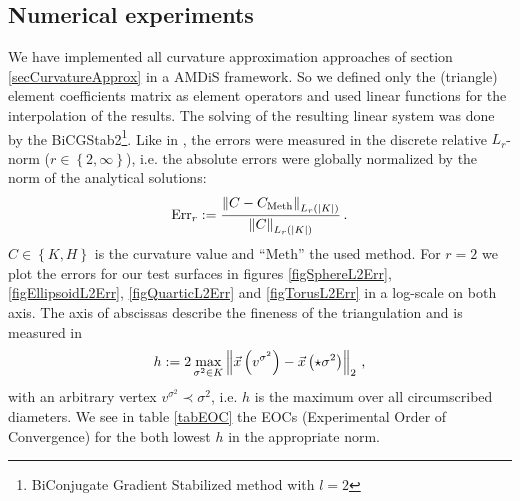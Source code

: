   \subsection{Numerical experiments}
    We have implemented all curvature approximation approaches of section \ref{secCurvatureApprox} in a AMDiS framework.
    So we defined only the (triangle) element coefficients matrix as element operators and used linear functions for the interpolation of
    the results.
    The solving of the resulting linear system was done by the BiCGStab2\footnote{BiConjugate Gradient Stabilized method with \( l=2 \)}.
    Like in \cite{heine}, the errors were measured in the discrete relative \( L_{r} \)-norm (\( r\in\left\{ 2,\infty \right\} \)), 
    i.e. the absolute errors were globally normalized by the norm of the analytical solutions:
    \begin{align}
      \text{Err}_{r} := \frac{\left\| C - C_{\text{Meth}} \right\|_{L_{r}(|K|)}}{ \left\| C \right\|_{L_{r}(|K|)}} \,\text{.}
    \end{align}
    \( C\in\left\{ K,H \right\} \) is the curvature value and ``\( \text{Meth} \)'' the used method.
    For \( r=2 \) we plot the errors for our test surfaces in figures \ref{figSphereL2Err}, \ref{figEllipsoidL2Err}, \ref{figQuarticL2Err} and
    \ref{figTorusL2Err} in a log-scale on both axis.
    The axis of abscissas describe the fineness of the triangulation and is measured in
    \begin{align}
      h := 2\max_{\sigma^{2}\in K} \left\| \vec{x}\left( v^{\sigma^{2}} \right) - \vec{x}\left( \star\sigma^{2} \right) \right\|_{2}
      \,\text{,}
    \end{align}
    with an arbitrary vertex \( v^{\sigma^{2}}\prec\sigma^{2} \),
    i.e. \( h \) is the maximum over all circumscribed diameters.
    We see in table \ref{tabEOC} the EOCs (Experimental Order of Convergence)
    for the both lowest \( h \) in the appropriate norm.
